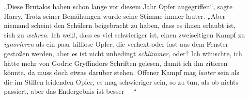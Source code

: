 „Diese Brutalos haben schon lange vor diesem Jahr Opfer angegriffen“, sagte Harry. Trotz seiner Bemühungen wurde seine Stimme immer lauter.
„Aber niemand scheint den Schülern beigebracht zu haben, dass es ihnen erlaubt ist, sich zu \emph{wehren}. Ich weiß, dass es viel schwieriger ist, einen zweiseitigen Kampf zu \emph{ignorieren} als ein paar hilflose Opfer, die verhext oder fast aus dem Fenster gestoßen werden, aber es ist nicht unbedingt \emph{schlimmer}, oder? Ich wünschte, ich hätte mehr von Godric Gryffindors Schriften gelesen, damit ich ihn zitieren könnte, da muss doch etwas darüber stehen. Offener Kampf mag \emph{lauter} sein als die im Stillen leidenden Opfer, es mag schwieriger sein, so zu tun, als ob nichts passiert, aber das Endergebnis ist besser —“

